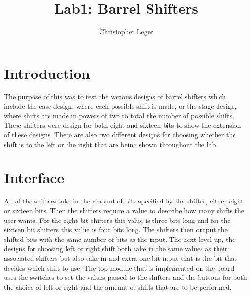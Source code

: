 \documentclass{article}\usepackage{graphicx} %
\author{Christopher Leger}
\title{Lab1: Barrel Shifters}
\begin{document}
\maketitle

\section{Introduction}
The purpose of this was to test the various designs of barrel shifters which include the case design, where each possible shift is made, or the stage design, where shifts are made in powers of two to total the number of possible shifts. These shifters were design for both eight and sixteen bits to show the extension of these designs. There are also two different designs for choosing whether the shift is to the left or the right that are being shown throughout the lab. 
\section{Interface}
All of the shifters take in the amount of bits specified by the shifter, either eight or sixteen bits. Then the shifters require a value to describe how many shifts the user wants. For the eight bit shifters this value is three bits long and for the sixteen bit shifters this value is four bits long. The shifters then output the shifted bits with the same number of bits as the input. The next level up, the designs for choosing left or right shift both take in the same values as their associated shifters but also take in and extra one bit input that is the bit that decides which shift to use. The top module that is implemented on the board uses the switches to set the values passed to the shifters and the buttons for both the choice of left or right and the amount of shifts that are to be performed. 
\end{document}
